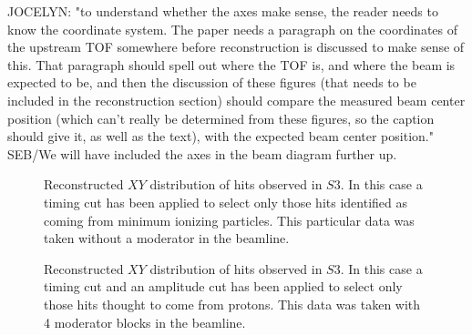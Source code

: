 JOCELYN: "to understand whether the axes make sense, the reader needs to know the coordinate system.  The paper needs a paragraph on the coordinates of the upstream TOF somewhere before reconstruction is discussed to make sense of this.  That paragraph should spell out where the TOF is, and where the beam is expected to be, and then the discussion of these figures (that needs to be included in the reconstruction section) should compare the measured beam center position (which can't really be determined from these figures, so the caption should give it, as well as the text), with the expected beam center position." SEB/We will have included the axes in the beam diagram further up.
\begin{figure}[t]
	\begin{minipage}[t]{0.49\textwidth}
		\centering
		\begin{adjustbox}{max totalsize={\textwidth}{.5\textheight},center}
			
		\end{adjustbox}
		\caption{Reconstructed $XY$ distribution of hits observed in $S3$. In this case a timing cut has been applied to select only those hits identified as coming from minimum ionizing particles. This particular data was taken without a moderator in the beamline.}
		\label{fig:s3XY_pion}
	\end{minipage} 	
	\hfill
	\begin{minipage}[t]{0.49\textwidth}
		\centering
		\begin{adjustbox}{max totalsize={\textwidth}{.5\textheight},center}
			
		\end{adjustbox}
		\caption{Reconstructed $XY$ distribution of hits observed in $S3$. In this case a timing cut and an amplitude cut has been applied to select only those hits thought to come from protons. This data was taken with 4 moderator blocks in the beamline.}
		\label{fig:s3XY_proton}
	\end{minipage}
\end{figure}
  
    

    




